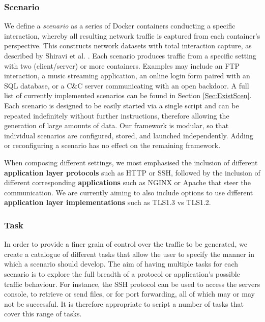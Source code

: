 \documentclass[runningheads]{llncs}
\begin{document}
\subsubsection*{Scenario}
We define a \emph{scenario} as a series of Docker containers conducting a specific interaction, whereby all resulting network traffic is captured from each container's perspective. This constructs network datasets with total interaction capture, as described by Shiravi et al. \cite{shiravi2012toward}. Each scenario produces traffic from a specific setting with two (client/server) or more containers. 
Examples may include an FTP interaction, a music streaming application, an online login form paired with an SQL database, or a C\&C server communicating with an open backdoor. A full list of currently implemented scenarios can be found in Section \textcolor{red}{\ref{Sec:ExistScen}}.
Each scenario is designed to be easily started via a single script and can be repeated indefinitely without further instructions, therefore allowing the generation of large amounts of data.
Our framework is modular, so that individual scenarios are configured, stored, and launched independently. Adding or reconfiguring a scenario has no effect on the remaining framework.

When composing different settings, we most emphasised the inclusion of different \textbf{application layer protocols} such as HTTP or SSH, followed by the inclusion of different corresponding \textbf{applications} such as NGINX or Apache that steer the communication. We are currently aiming to also include options to use different \textbf{application layer implementations} such as TLS1.3 vs TLS1.2.

\subsubsection*{Task} \label{Sec:Subscenarios}

In order to provide a finer grain of control over the traffic to be generated, we create a catalogue of different tasks that allow the user to specify the manner in which a scenario should develop. The aim of having multiple tasks for each scenario is to explore the full breadth of a protocol or application's possible traffic behaviour. For instance, the SSH protocol can be used to access the servers console, to retrieve or send files, or for port forwarding, all of which may or may not be successful. It is therefore appropriate to script a number of tasks that cover this range of tasks.
\end{document}
